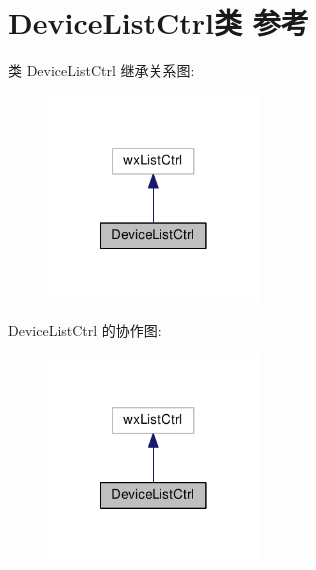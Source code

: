 \hypertarget{class_device_list_ctrl}{\section{Device\+List\+Ctrl类 参考}
\label{class_device_list_ctrl}
}


类 Device\+List\+Ctrl 继承关系图\+:
\nopagebreak
\begin{figure}[H]
\begin{center}
\leavevmode
\includegraphics[width=158pt]{class_device_list_ctrl__inherit__graph}
\end{center}
\end{figure}


Device\+List\+Ctrl 的协作图\+:
\nopagebreak
\begin{figure}[H]
\begin{center}
\leavevmode
\includegraphics[width=158pt]{class_device_list_ctrl__coll__graph}
\end{center}
\end{figure}
